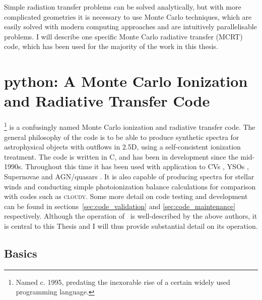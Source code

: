 Simple radiation transfer problems can be solved analytically,
but with more complicated geometries it is necessary to use Monte Carlo
techniques, which are easily solved with modern computing approaches and 
are intuitively parallelisable problems. I will describe one specific 
Monte Carlo radiative transfer (MCRT) code, which has been used
for the majority of the work in this thesis.

\section{{\sc python}: A Monte Carlo Ionization and Radiative Transfer Code}
\label{sec:python}

\py\footnote{Named c. 1995, predating the inexorable rise of a certain widely used
programming language.} is a confusingly named 
Monte Carlo ionization and radiative transfer code. 
The general philosophy of the code is to be able to produce synthetic spectra
for astrophysical objects with outflows in 2.5D, using a self-consistent ionization 
treatment. The code is written in C, and has been in development since the mid-1990s.
Throughout this time it has been used with application to CVs \citep{LK02, M15},
YSOs \citep{simmacro2005}, Supernovae \citep{kerzendorfsim} and AGN/quasars 
\citep{higginbottom2013,H14,M16}. It is also capable of producing spectra 
for stellar winds and conducting simple photoionization balance calculations for
comparison with codes such as \textsc{cloudy}. Some more detail on code testing and 
development can be found in sections~\ref{sec:code_validation} and \ref{sec:code_maintenance}
respectively. Although the operation of \py\ is well-described by the above authors,
it is central to this Thesis and I will thus provide substantial detail on its operation. 

\subsection{Basics}


